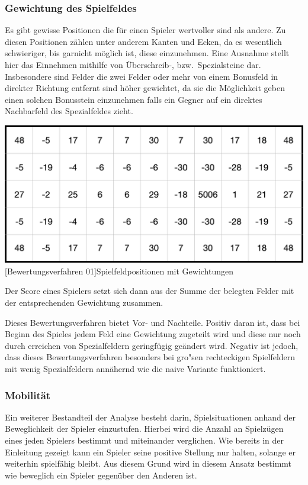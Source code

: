 \subsubsection{Gewichtung des Spielfeldes}\label{subsubsec:gewichtung-des-spielfeldes}
Es gibt gewisse Positionen die f\"ur einen Spieler wertvoller sind als andere.
Zu diesen Positionen z\"ahlen unter anderem Kanten und Ecken, da es wesentlich schwieriger, bis garnicht m\"oglich ist, diese einzunehmen.
Eine Ausnahme stellt hier das Einnehmen mithilfe von \"Uberschreib-, bzw.\ Spezialsteine dar.
Insbesondere sind Felder die zwei Felder oder mehr von einem Bonusfeld in direkter Richtung entfernt sind h\"oher gewichtet, da sie die M\"oglichkeit geben einen solchen Bonusstein einzunehmen falls ein Gegner auf ein direktes Nachbarfeld des Spezialfeldes zieht.

\vspace{1em}
\begin{minipage}{\linewidth}
    \centering
    \includegraphics[width=0.5\linewidth]{pics/rating}
    [Bewertungsverfahren 01]{Spielfeldpositionen mit Gewichtungen}
    \label{fig:bewertungsverfahren01}
\end{minipage}

Der Score eines Spielers setzt sich dann aus der Summe der belegten Felder mit der entsprechenden Gewichtung zusammen.

Dieses Bewertungsverfahren bietet Vor- und Nachteile.
Positiv daran ist, dass bei Beginn des Spieles jedem Feld eine Gewichtung zugeteilt wird und diese nur noch durch erreichen von Spezialfeldern geringf\"ugig ge\"andert wird.
Negativ ist jedoch, dass dieses Bewertungsverfahren besonders bei gro"sen rechteckigen Spielfeldern mit wenig Spezialfeldern ann\"ahernd wie die naive Variante funktioniert.

\subsubsection{Mobilit\"at}\label{subsubsec:mobilitaet}
Ein weiterer Bestandteil der Analyse besteht darin, Spielsituationen anhand der Beweglichkeit der Spieler einzustufen.
Hierbei wird die Anzahl an Spielz\"ugen eines jeden Spielers bestimmt und miteinander verglichen.
Wie bereits in der Einleitung gezeigt kann ein Spieler seine positive Stellung nur halten, solange er weiterhin spielf\"ahig bleibt.
Aus diesem Grund wird in diesem Ansatz bestimmt wie beweglich ein Spieler gegen\"uber den Anderen ist.

